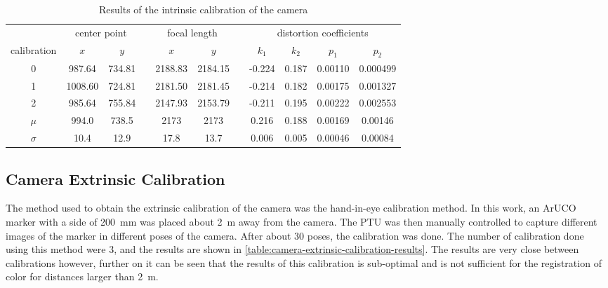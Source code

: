 \begin{table}[h]
    \caption{Results of the intrinsic calibration of the camera}

    \centering
    \begin{tabular}{@{} c cc c cc c cccc @{} }
        \toprule
           & \multicolumn{2}{c}{center point} & & \multicolumn{2}{c}{focal length} & & \multicolumn{4}{c}{distortion coefficients} \\
        \cmidrule{2-3} \cmidrule{5-6} \cmidrule{8-11}

        {calibration} & $x$ & $y$ &  & $x$ & $y$ & & $k_1$ & $k_2$ & $p_1$ & $p_2$  \\
        \midrule
        0 &   987.64 & 734.81 & & 2188.83 & 2184.15 & & -0.224 & 0.187 & 0.00110 & 0.000499  \\
        1 &  1008.60 & 724.81 & & 2181.50 & 2181.45 & & -0.214 & 0.182 & 0.00175 & 0.001327  \\
        2 &   985.64 & 755.84 & & 2147.93 & 2153.79 & & -0.211 & 0.195 & 0.00222 & 0.002553  \\
        \midrule
        $\mu$    & 994.0 & 738.5 & & 2173   & 2173   & & 0.216 & 0.188 & 0.00169  & 0.00146 \\
        $\sigma$ &  10.4 &  12.9 & &   17.8 &   13.7 & & 0.006 & 0.005 & 0.00046  & 0.00084 \\
        \bottomrule
    \end{tabular}

    \label{table:camera-intrinsic-calibration-results}
\end{table}

\subsection{Camera Extrinsic Calibration}

The method used to obtain the extrinsic calibration of the camera was the hand-in-eye calibration method. In this work, an ArUCO marker with a side of \SI{200}{\milli\meter} was placed about \SI{2}{\meter} away from the camera. The PTU was then manually controlled to capture different images of the marker in different poses of the camera. After about 30 poses, the calibration was done. The number of calibration done using this method were 3, and the results are shown in \cref{table:camera-extrinsic-calibration-results}. The results are very close between calibrations however, further on it can be seen that the results of this calibration is sub-optimal and is not sufficient for the registration of color for distances larger than \SI{2}{\meter}.

